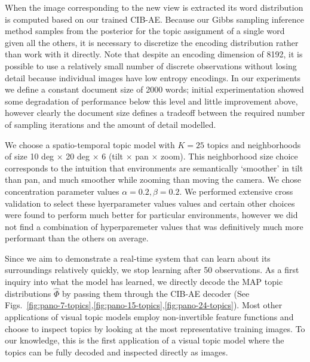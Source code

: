 When the image corresponding to the new view is extracted its word distribution is computed based on our trained CIB-AE. Because our Gibbs sampling inference method samples from the posterior for the topic assignment of a single word given all the others, it is necessary to discretize the encoding distribution rather than work with it directly. Note that despite an encoding dimension of 8192, it is possible to use a relatively small number of discrete observations without losing detail because individual images have low entropy encodings. In our experiments we define a constant document size of 2000 words; initial experimentation showed some degradation of performance below this level and little improvement above, however clearly the document size defines a tradeoff between the required number of sampling iterations and the amount of detail modelled.

We choose a spatio-temporal topic model with $K = 25$ topics and neighborhoods of size 10 deg $\times$ 20 deg $\times$ 6 (tilt $\times$ pan $\times$ zoom). This neighborhood size choice corresponds to the intuition that environments are semantically `smoother' in tilt than pan, and much smoother while zooming than moving the camera. We chose concentration parameter values $\alpha = 0.2, \beta = 0.2$. We performed extensive cross validation to select these hyerparameter values values and certain other choices were found to perform much better for particular environments, however we did not find a combination of hyperparemeter values that was definitively much more performant than the others on average.

Since we aim to demonstrate a real-time system that can learn about its surroundings relatively quickly, we stop learning after 50 observations. As a first inquiry into what the model has learned, we directly decode the MAP topic distributions $\hat{\Phi}$ by passing them through the CIB-AE decoder (See Figs.~\ref{fig:pano-7-topics},\ref{fig:pano-15-topics},\ref{fig:pano-24-topics}). Most other applications of visual topic models employ non-invertible feature functions and choose to inspect topics by looking at the most representative training images. To our knowledge, this is the first application of a visual topic model where the topics can be fully decoded and inspected directly as images.

